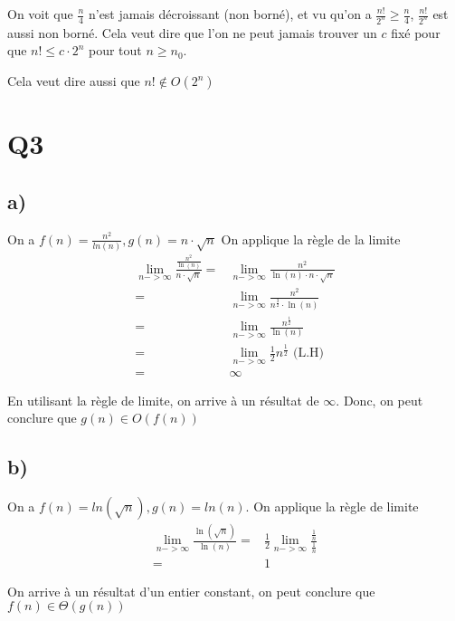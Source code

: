 \documentclass[10pt,a4paper]{article}
\begin{document}
On voit que $\frac{n}{4}$ n'est jamais décroissant (non borné), et vu qu'on a $\frac{n!}{2^n} \geq \frac{n}{4}$, $\frac{n!}{2^n}$ est aussi non borné. Cela veut dire que l'on ne peut jamais trouver un $c$ fixé pour que $n! \leq c \cdot 2^n$ pour tout $n \geq n_0$.

Cela veut dire aussi que $n! \notin O(2^n)$
\newpage
\section{Q3}
\subsection{a)}
On a $f(n) = \frac{n^2}{ln(n)}, g(n) = n \cdot \sqrt{n}$ On applique la règle de la limite
\begin{align*}
    \lim_{n->\infty} \frac{\frac{n^2}{\ln(n)}}{n \cdot \sqrt{n}} =&  \lim_{n->\infty} \frac{n^2}{\ln(n) \cdot n \cdot \sqrt{n}} \\
    =& \lim_{n->\infty} \frac{n^2}{n^{\frac{3}{2}}\cdot \ln(n)} \\
    =& \lim_{n->\infty} \frac{n^{\frac{1}{2}}}{\ln(n)} \\
    =& \lim_{n->\infty} \frac{1}{2}n^{\frac{1}{2}} \text{ (L.H) }\\
    =& \infty
\end{align*}

En utilisant la règle de limite, on arrive à un résultat de $\infty$. Donc, on peut conclure que $g(n) \in O(f(n))$

\subsection{b)}
On a $f(n) = ln(\sqrt{n}), g(n) = ln(n)$. On applique la règle de limite
\begin{align*}
    \lim_{n->\infty} \frac{\ln(\sqrt{n})}{\ln(n)} =& \frac{1}{2} \lim_{n->\infty} \frac{\frac{1}{n}}{\frac{1}{n}} \\
    =& 1
\end{align*}

On arrive à un résultat d'un entier constant, on peut conclure que $f(n) \in \Theta(g(n))$
\end{document}

